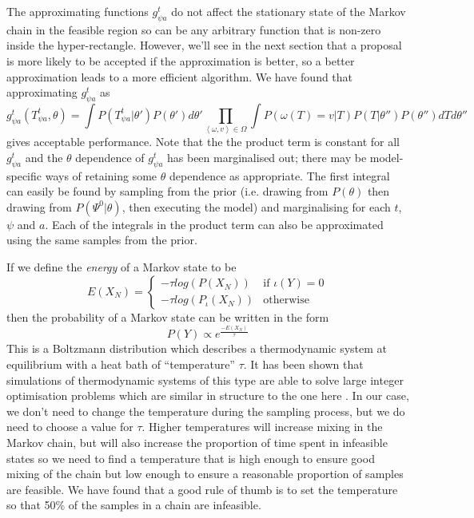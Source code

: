 \documentclass{article}
\begin{document}
The approximating functions $g^t_{\psi a}$ do not affect the stationary state of the Markov chain in the feasible region so can be any arbitrary function that is non-zero inside the hyper-rectangle. However, we'll see in the next section that a proposal is more likely to be accepted if the approximation is better, so a better approximation leads to a more efficient algorithm. We have found that approximating $g^t_{\psi a}$ as 
\[
g^t_{\psi a}(T^t_{\psi a},\theta) = \int P(T^t_{\psi a}|\theta')P(\theta')d\theta' \prod_{\left<\omega,v\right> \in \Omega} \int P(\omega(T)=v|T)P(T|\theta'')P(\theta'') dT  d\theta''
\]
gives acceptable performance. Note that the the product term is constant for all $g^t_{\psi a}$ and the $\theta$ dependence of $g^t_{\psi a}$ has been marginalised out; there may be model-specific ways of retaining some $\theta$ dependence as appropriate. The first integral can easily be found by sampling from the prior (i.e. drawing from $P(\theta)$  then drawing from $P(\Psi^0|\theta)$, then executing the model) and marginalising for each $t$, $\psi$ and $a$. Each of the integrals in the product term can also be approximated using the same samples from the prior.

If we define the \textit{energy} of a Markov state to be
\[
E(X_N) =
\begin{cases}
-\tau log(P(X_N)) & \text{if }  \iota(Y) = 0\\
-\tau log(P_\iota(X_N)) & \text{otherwise}
\end{cases}
\]
then the probability of a Markov state can be written in the form
\begin{equation}
P(Y) \propto e^{\frac{-E(X_N)}{\tau}}
\end{equation}
This is a Boltzmann distribution which describes a thermodynamic system at equilibrium with a heat bath of ``temperature'' $\tau$. It has been shown that simulations of thermodynamic systems of this type are able to solve large integer optimisation problems which are similar in structure to the one here \citep{kirkpatrick1983optimization}. In our case, we don't need to change the temperature during the sampling process, but we do need to choose a value for $\tau$. Higher temperatures will increase mixing in the Markov chain, but will also increase the proportion of time spent in infeasible states so we need to find a temperature that is high enough to ensure good mixing of the chain but low enough to ensure a reasonable proportion of samples are feasible. We have found that a good rule of thumb is to set the temperature so that 50\% of the samples in a chain are infeasible.
\end{document}
